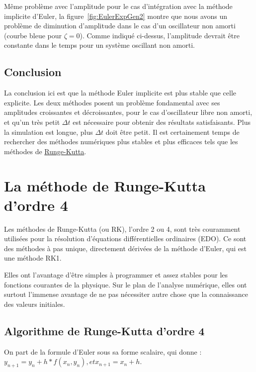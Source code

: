 \documentclass[%
oneside,                 %
final,                   %
10pt]{article}
\begin{document}
Même problème avec l'amplitude pour le cas d'intégration avec la méthode implicite d'Euler, la figure~\ref{fig:EulerExpGen2} montre que nous avons un problème de diminution d'amplitude dans le cas d'un oscillateur non amorti (courbe bleue pour $\zeta = 0$). Comme indiqué ci-dessus, l'amplitude devrait être constante dans le temps pour un système oscillant non amorti.

\subsection{Conclusion}
La conclusion ici est que la méthode Euler implicite est plus stable que celle explicite. Les deux méthodes posent un problème fondamental avec ses amplitudes croissantes et décroissantes, pour le cas d'oscillateur libre non amorti, et qu’un très petit $\Delta t$ est nécessaire pour obtenir des résultats satisfaisants. Plus la simulation est longue, plus $\Delta t$ doit être petit. Il est certainement temps de rechercher des méthodes numériques plus stables et plus efficaces tels que les méthodes de \href{{https://fr.wikipedia.org/wiki/M%C3%A9thodes_de_Runge-Kutta}}{Runge-Kutta}.

\section{La méthode de Runge-Kutta d'ordre 4}
Les méthodes de Runge-Kutta (ou RK), l'ordre 2 ou 4, sont très couramment utilisées pour la résolution d'équations différentielles ordinaires (EDO). Ce sont des méthodes à pas unique, directement dérivées de la méthode d'Euler, qui est une méthode RK1.

Elles ont l'avantage d'être simples à programmer et assez stables pour les fonctions courantes de la physique. Sur le plan de l'analyse numérique, elles ont surtout l'immense avantage de ne pas nécessiter autre chose que la connaissance des valeurs initiales.

\subsection{Algorithme de Runge-Kutta d'ordre 4}
On part de la formule d'Euler sous sa forme scalaire, qui donne : $y_{n+1} = y_n + h*f(x_n, y_n), et x_{n+1} = x_n + h$.
\end{document}
